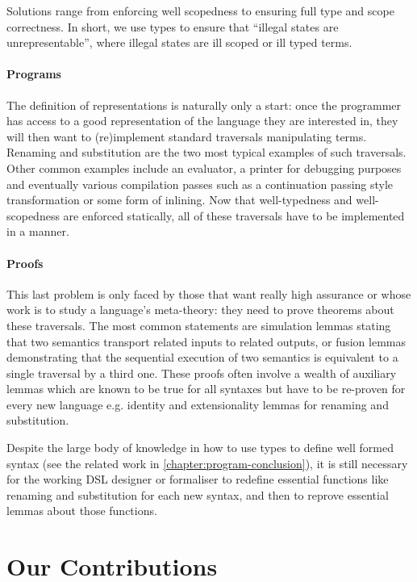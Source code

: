 Solutions range from enforcing well scopedness to ensuring full type and scope
correctness. In short, we use types to ensure that ``illegal states are unrepresentable'',
where illegal states are ill scoped or ill typed terms.

\paragraph{Programs}
The definition of \scopeandtypesafe{} representations is naturally only a start:
once the programmer has access to a good representation of the language they are
interested in, they will then want to (re)implement standard traversals
manipulating terms. Renaming and substitution are the two most typical examples
of such traversals. Other common examples include an evaluator, a printer for
debugging purposes and eventually various compilation passes such as a continuation
passing style transformation or some form of inlining. Now that well-typedness
and well-scopedness are enforced statically, all of these traversals have to be
implemented in a \scopeandtypesafe{} manner.

\paragraph{Proofs} This last problem is only faced by those that want really high assurance or whose
work is to study a language's meta-theory: they need to prove theorems about these
traversals. The most common statements are simulation lemmas stating that two
semantics transport related inputs to related outputs, or fusion lemmas demonstrating
that the sequential execution of two semantics is equivalent to a single traversal
by a third one. These proofs often involve a wealth of auxiliary lemmas which are
known to be true for all syntaxes but have to be re-proven for every new language
e.g. identity and extensionality lemmas for renaming and substitution.

Despite the large body of knowledge in how to use types to define well formed
syntax (see the related work in \cref{chapter:program-conclusion}), it is still
necessary for the working DSL designer or formaliser to redefine essential
functions like renaming and substitution for each new syntax, and then to
reprove essential lemmas about those functions.

\section{Our Contributions}

